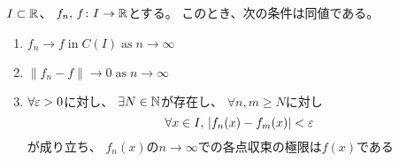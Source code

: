 \documentclass[report]{jlreq}
\begin{document}
\begin{proposition}[一様 Cauchy 条件]
    $I \subset \mathbb{R}$、
    $f_n,\, f \colon I \to \mathbb{R}$とする。
    このとき、次の条件は同値である。
    \begin{enumerate}
        \item $f_n \to f \;\text{in}\; C(I) \;\text{as}\; n \to \infty$
        \item $\| f_n - f \| \to 0 \;\text{as}\; n \to \infty$
        \item $\forall \varepsilon > 0$に対し、
            $\exists N \in \mathbb{N}$が存在し、
            $\forall n, m \ge N$に対し
            \begin{equation}
                \forall x \in I,\, |f_n(x) - f_m(x)| < \varepsilon
            \end{equation}
            が成り立ち、
            $f_n(x)$の$n \to \infty$での各点収束の極限は$f(x)$である
    \end{enumerate}
\end{proposition}
\end{document}
